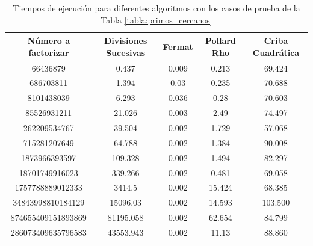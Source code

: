     \begin{table}[H]
        \centering
        \begin{adjustbox}{width=\columnwidth,center}
        \begin{tabular}{|c|c|c|c|c|}
        \hline
        Número a factorizar & Divisiones Sucesivas & Fermat & Pollard Rho & Criba Cuadrática\\ \hline
        66436879        & 0.437                  & 0.009                  & 0.213                  & 69.424                 \\ \hline
        686703811       & 1.394                  & 0.03                   & 0.235                  & 70.688                 \\ \hline
        8101438039      & 6.293                  & 0.036                  & 0.28                   & 70.603                 \\ \hline
        85526931211     & 21.026                 & 0.003                  & 2.49                   & 74.497                 \\ \hline
        262209534767    & 39.504                 & 0.002                  & 1.729                  & 57.068                 \\ \hline
        715281207649    & 64.788                 & 0.002                  & 1.384                  & 90.008                 \\ \hline
        1873966393597   & 109.328                & 0.002                  & 1.494                  & 82.297                 \\ \hline
        18701749916023  & 339.266                & 0.002                  & 0.481                  & 69.058                 \\ \hline
        1757788889012333 & 3414.5                & 0.002                  & 15.424                 & 68.385                 \\ \hline
        34843998810184129 & 15096.03             & 0.002                  & 14.593                 &   103.500                     \\ \hline
        874655409151893869 & 81195.058           & 0.002                  & 62.654                 &  84.799                      \\ \hline
        286073409635796583 & 43553.943           & 0.002                  & 11.13                  &  88.860                      \\ \hline
        \end{tabular}
        \end{adjustbox}
        \caption{Tiempos de ejecución para diferentes algoritmos con los casos de prueba de la Tabla \ref{tabla:primos_cercanos}}
        \label{tabla:tiempos}
    \end{table}

